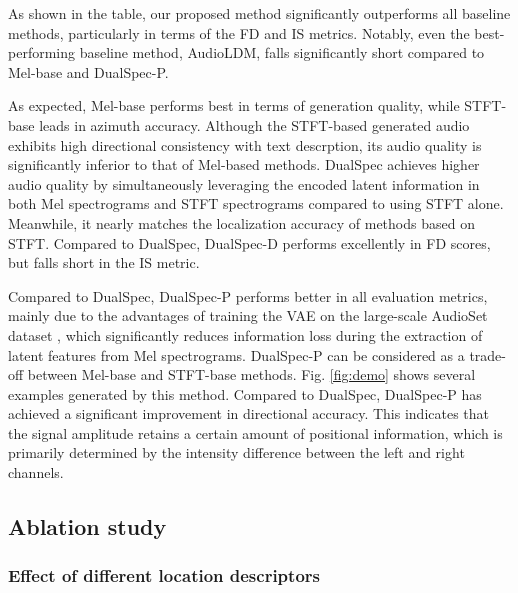 \documentclass{IEEEtran}
\begin{document}
As shown in the table, our proposed method significantly outperforms all baseline methods, particularly in terms of the FD and IS metrics. Notably, even the best-performing baseline method, AudioLDM, falls significantly short compared to Mel-base and DualSpec-P.

{As expected, Mel-base performs best in terms of generation quality, while STFT-base leads in azimuth accuracy. Although the STFT-based generated audio exhibits high directional consistency with text descrption, its audio quality is significantly inferior to that of Mel-based methods. DualSpec achieves higher audio quality by simultaneously leveraging the encoded latent information in both Mel spectrograms and STFT spectrograms compared to using STFT alone. Meanwhile, it nearly matches the localization accuracy of methods based on STFT. Compared to DualSpec, DualSpec-D performs excellently in FD scores, but falls short in the IS metric.}

{Compared to DualSpec, DualSpec-P performs better in all evaluation metrics, mainly due to the advantages of training the VAE on the large-scale AudioSet dataset \cite{gemmeke2017audio}, which significantly reduces information loss during the extraction of latent features from Mel spectrograms. DualSpec-P can be considered as a trade-off between Mel-base and STFT-base methods. Fig. \ref{fig:demo} shows several examples generated by this method. Compared to DualSpec, DualSpec-P has achieved a significant improvement in directional accuracy. This indicates that the signal amplitude retains a certain amount of positional information, which is primarily determined by the intensity difference between the left and right channels. }




\subsection{Ablation study}
\label{subsec: Ablations on Direction Caption}


\subsubsection{Effect of different location descriptors}
\label{subsubsec: Effect of different location descriptors}
\end{document}
